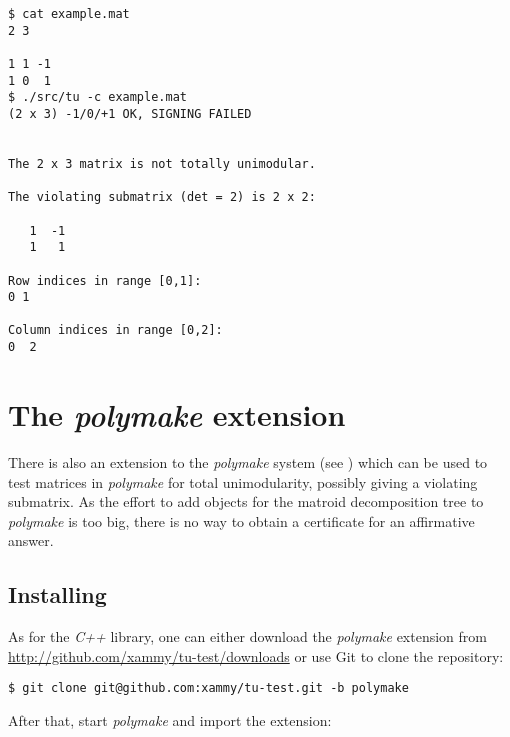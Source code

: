 \documentclass[12pt]{article}
\newcommand{\Cpp}{{\em C++ }}
\newcommand{\Polymake}{{\em polymake }}
\begin{document}
{\tiny
{}
\begin{lstlisting}
$ cat example.mat 
2 3

1 1 -1
1 0  1
$ ./src/tu -c example.mat 
(2 x 3) -1/0/+1 OK, SIGNING FAILED


The 2 x 3 matrix is not totally unimodular.

The violating submatrix (det = 2) is 2 x 2:

   1  -1
   1   1

Row indices in range [0,1]:
0 1

Column indices in range [0,2]:
0  2 

\end{lstlisting}}

\section{The \Polymake extension }

There is also an extension to the \Polymake system (see \citeauthor{Polymake}) which can be used to test matrices in \Polymake
for total unimodularity, possibly giving a violating submatrix. As the effort to add objects for
the matroid decomposition tree to \Polymake is too big, there is no way to obtain a certificate for
an affirmative answer.

\subsection{Installing}

As for the \Cpp library, one can either download the \Polymake extension from 
\url{http://github.com/xammy/tu-test/downloads} or use Git to clone the repository:

{\tiny
{}
\begin{lstlisting}
$ git clone git@github.com:xammy/tu-test.git -b polymake
\end{lstlisting}}

After that, start \Polymake and import the extension:
\end{document}
